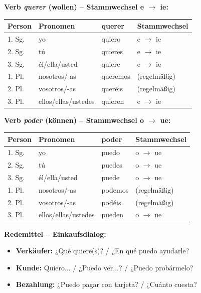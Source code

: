\documentclass[11pt,a4paper]{article}
\begin{document}
\textbf{Verb \textit{querer} (wollen) -- Stammwechsel e $\rightarrow$ ie:}
\begin{center}
\begin{tabular}{|l|l|l|l|}
\hline
\textbf{Person} & \textbf{Pronomen} & \textbf{querer} & \textbf{Stammwechsel} \\
\hline
1. Sg. & yo & quiero & e $\rightarrow$ ie \\
2. Sg. & tú & quieres & e $\rightarrow$ ie \\
3. Sg. & él/ella/usted & quiere & e $\rightarrow$ ie \\
1. Pl. & nosotros/-as & queremos & (regelmäßig) \\
2. Pl. & vosotros/-as & queréis & (regelmäßig) \\
3. Pl. & ellos/ellas/ustedes & quieren & e $\rightarrow$ ie \\
\hline
\end{tabular}
\end{center}

\vspace{1em}

\textbf{Verb \textit{poder} (können) -- Stammwechsel o $\rightarrow$ ue:}
\begin{center}
\begin{tabular}{|l|l|l|l|}
\hline
\textbf{Person} & \textbf{Pronomen} & \textbf{poder} & \textbf{Stammwechsel} \\
\hline
1. Sg. & yo & puedo & o $\rightarrow$ ue \\
2. Sg. & tú & puedes & o $\rightarrow$ ue \\
3. Sg. & él/ella/usted & puede & o $\rightarrow$ ue \\
1. Pl. & nosotros/-as & podemos & (regelmäßig) \\
2. Pl. & vosotros/-as & podéis & (regelmäßig) \\
3. Pl. & ellos/ellas/ustedes & pueden & o $\rightarrow$ ue \\
\hline
\end{tabular}
\end{center}

\textbf{Redemittel -- Einkaufsdialog:}
\begin{itemize}
    \item \textbf{Verkäufer:} ¿Qué quiere(s)? / ¿En qué puedo ayudarle?
    \item \textbf{Kunde:} Quiero... / ¿Puedo ver...? / ¿Puedo probármelo?
    \item \textbf{Bezahlung:} ¿Puedo pagar con tarjeta? / ¿Cuánto cuesta?
\end{itemize}
\end{document}

